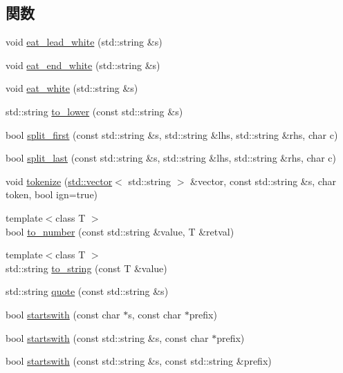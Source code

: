 \subsection*{関数}
\begin{DoxyCompactItemize}
\item 
void \hyperlink{str_8hh_ac540cdd701bba93f6061b0772f132cc6}{eat\_\-lead\_\-white} (std::string \&s)
\item 
void \hyperlink{str_8hh_af45c9e4bdc7b8be0a63dac2972f74188}{eat\_\-end\_\-white} (std::string \&s)
\item 
void \hyperlink{str_8hh_ac53e62953cefb749b9d3a80eba3084b4}{eat\_\-white} (std::string \&s)
\item 
std::string \hyperlink{str_8hh_a83357519334853e90ee75c6deb86ed74}{to\_\-lower} (const std::string \&s)
\item 
bool \hyperlink{str_8hh_a5f91fe9e528c171c7df654465e085fa5}{split\_\-first} (const std::string \&s, std::string \&lhs, std::string \&rhs, char c)
\item 
bool \hyperlink{str_8hh_a710d749c1d6bedb9dae961a945f24cb0}{split\_\-last} (const std::string \&s, std::string \&lhs, std::string \&rhs, char c)
\item 
void \hyperlink{str_8hh_a8db9863989509957fc95cdbcfd38cf62}{tokenize} (\hyperlink{classstd_1_1vector}{std::vector}$<$ std::string $>$ \&vector, const std::string \&s, char token, bool ign=true)
\item 
{\footnotesize template$<$class T $>$ }\\bool \hyperlink{str_8hh_aeb8c492d16beefb8b43c31d4e3dc3ab0}{to\_\-number} (const std::string \&value, T \&retval)
\item 
{\footnotesize template$<$class T $>$ }\\std::string \hyperlink{str_8hh_a61cce639667f3e4f1d8790c4fec5c439}{to\_\-string} (const T \&value)
\item 
std::string \hyperlink{str_8hh_adf03d3b3ac6621980b69277e795fa55b}{quote} (const std::string \&s)
\item 
bool \hyperlink{str_8hh_ac7909aa456343d780d6a9080a83b6d66}{startswith} (const char $\ast$s, const char $\ast$prefix)
\item 
bool \hyperlink{str_8hh_ae05becd6094e015866b3eb856de59a16}{startswith} (const std::string \&s, const char $\ast$prefix)
\item 
bool \hyperlink{str_8hh_a2c644cc2d600fe809a4fe1497ebe135a}{startswith} (const std::string \&s, const std::string \&prefix)
\end{DoxyCompactItemize}


